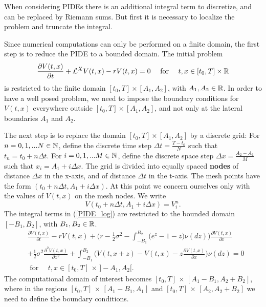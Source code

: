 When considering PIDEs there is an additional integral term to discretize, 
and can be replaced by Riemann sums. But first it is necessary to localize the problem and truncate the integral.

Since numerical computations can only be performed on a finite domain, the first step is to reduce the PIDE to a bounded domain.
The initial problem
$$  \frac{\partial V(t,x)}{\partial t} + \mathcal{L}^{X} V(t,x) -r V(t,x) = 0  \quad \mbox{ for } \quad t,x \in [t_0,T]\times \mathbb{R} $$
is restricted to the finite domain $ [t_0,T]\times [A_1,A_2]$, with $A_1, A_2 \in \mathbb{R}$.
In order to have a well posed problem, we need to impose the boundary conditions for $V(t,x)$ everywhere outside $[t_0,T]\times [A_1,A_2]$, 
and not only at the lateral boundaries $A_1$ and $A_2$.

The next step is to replace the domain $[t_0,T]\times [A_1,A_2]$ by a discrete grid:
For $n = 0,1, ... N \in \mathbb{N}$, define the discrete time step $ \Delta t = \frac{T - t_0}{N} $ such that
$t_n = t_0 + n \Delta t$. For $i = 0,1, ... M \in \mathbb{N}$, define the discrete space step $ \Delta x = \frac{A_2 - A_1}{M} $ such that
$x_i = A_1 + i \Delta x$.
The grid is divided into equally spaced \textbf{nodes} of distance $\Delta x$ in the x-axis, and of distance $\Delta t$ in the t-axis.
The mesh points have the form $(t_0 + n \Delta t, A_1 + i \Delta x)$.
At this point we concern ourselves only with the values of $V(t,x)$ on the mesh nodes. We write 
$$ V(t_0 + n \Delta t, A_1 + i \Delta x) = V^n_i .$$
The integral terms in (\ref{PIDE_log}) are restricted to the bounded domain $[-B_1,B_2]$, with $B_1,B_2 \in \mathbb{R}$.
\begin{align}\label{restricted_domain}
&  \frac{\partial V(t,x)}{\partial t} - r V(t,x) 
          + \biggl( r -\frac{1}{2}\sigma^2 - \int_{-B_1}^{B_2} \bigl( e^z-1-z \bigr) \nu(dz) \biggr) \frac{\partial V(t,x)}{\partial x} \\ \nonumber
          &+ \frac{1}{2} \sigma^2 \frac{\partial^2 V(t,x)}{\partial x^2} 
          + \int_{-B_1}^{B_2} \bigl( V(t,x+z)- V(t,x) - z \frac{\partial V(t,x)}{\partial x} \bigr) \nu(dz)  = 0 \\ \nonumber
          & \mbox{ for } \quad t,x \in [t_0,T]\, \times \, ]-A_1,A_2[.
\end{align}
The computational domain of interest becomes $[t_0,T]\, \times \, [A_1-B_1,A_2+B_2]$, where in the regions $[t_0,T]\, \times \, [A_1-B_1,A_1]$ and 
$[t_0,T]\, \times \, [A_2,A_2+B_2]$ we need to define the boundary conditions.

